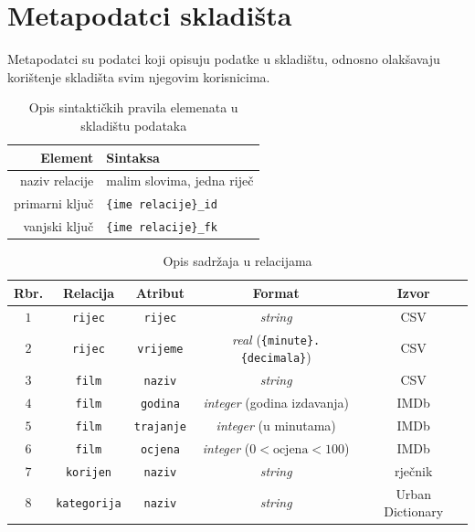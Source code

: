 \documentclass[11pt]{foi}
\begin{document}
\section{Metapodatci skladišta}

Metapodatci su podatci koji opisuju podatke u skladištu, odnosno olakšavaju
korištenje skladišta svim njegovim korisnicima.

\begin{table}[h]
	\centering
	\begin{tabular}{rl}
		\toprule
		Element&Sintaksa\\
		\midrule
		naziv relacije & malim slovima, jedna riječ\\
		primarni ključ& \texttt{\{ime relacije\}\_id}\\
		vanjski ključ& \texttt{\{ime relacije\}\_fk}\\
		\bottomrule
	\end{tabular}
	\caption{Opis sintaktičkih pravila elemenata u skladištu podataka}
\end{table}



\begin{table}[h]
	\centering
\begin{tabular}{c c c c c}
	\toprule
	Rbr.&Relacija &Atribut&Format&Izvor\\
	\midrule
	$1$&\texttt{rijec}&\texttt{rijec}	&\textit{string}	&CSV\\
	$2$&\texttt{rijec}&\texttt{vrijeme}&\textit{real}
	(\texttt{\{minute\}.\{decimala\}})\footnotemark&CSV\\
	$3$&\texttt{film} &\texttt{naziv} &\textit{string}&CSV\\
	$4$&\texttt{film} &\texttt{godina}&\textit{integer} (godina izdavanja)&IMDb\\
	$5$&\texttt{film} &\texttt{trajanje}&\textit{integer} (u minutama) &IMDb\\
	$6$&\texttt{film} &\texttt{ocjena}&\textit{integer} ($0<\text{ocjena}<100$)&IMDb\\
	$7$&\texttt{korijen} &\texttt{naziv}&\textit{string}&rječnik\\
	$8$&\texttt{kategorija} &\texttt{naziv}&\textit{string}&Urban Dictionary\\
	\bottomrule
\end{tabular}
	\caption{Opis sadržaja u relacijama}
\end{table}

\end{document}
